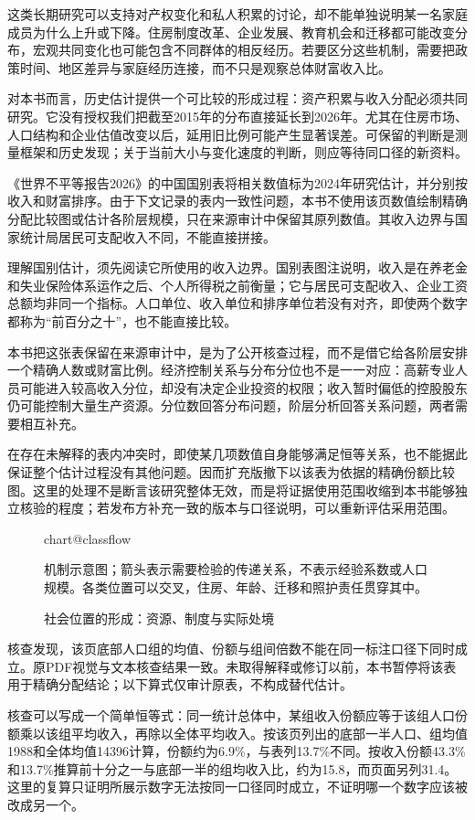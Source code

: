 \documentclass[UTF8,fontset=fandol,zihao=-4,oneside,openany]{ctexbook}
\makeatletter
\newcommand{\Chart}[3]{\begin{figure}[htbp]\centering\csname chart@#1\endcsname\caption{#2}\par\small #3\end{figure}}
\makeatother
\begin{document}
这类长期研究可以支持对产权变化和私人积累的讨论，却不能单独说明某一名家庭成员为什么上升或下降。住房制度改革、企业发展、教育机会和迁移都可能改变分布，宏观共同变化也可能包含不同群体的相反经历。若要区分这些机制，需要把政策时间、地区差异与家庭经历连接，而不只是观察总体财富收入比。

对本书而言，历史估计提供一个可比较的形成过程：资产积累与收入分配必须共同研究。它没有授权我们把截至2015年的分布直接延长到2026年。尤其在住房市场、人口结构和企业估值改变以后，延用旧比例可能产生显著误差。可保留的判断是测量框架和历史发现；关于当前大小与变化速度的判断，则应等待同口径的新资料。

《世界不平等报告2026》的中国国别表将相关数值标为2024年研究估计，并分别按收入和财富排序。由于下文记录的表内一致性问题，本书不使用该页数值绘制精确分配比较图或估计各阶层规模，只在来源审计中保留其原列数值。其收入边界与国家统计局居民可支配收入不同，不能直接拼接。\cite{WID2026}

\label{arg:P164}
理解国别估计，须先阅读它所使用的收入边界。国别表图注说明，收入是在养老金和失业保险体系运作之后、个人所得税之前衡量；它与居民可支配收入、企业工资总额均非同一个指标。人口单位、收入单位和排序单位若没有对齐，即使两个数字都称为“前百分之十”，也不能直接比较。

本书把这张表保留在来源审计中，是为了公开核查过程，而不是借它给各阶层安排一个精确人数或财富比例。经济控制关系与分布分位也不是一一对应：高薪专业人员可能进入较高收入分位，却没有决定企业投资的权限；收入暂时偏低的控股股东仍可能控制大量生产资源。分位数回答分布问题，阶层分析回答关系问题，两者需要相互补充。

在存在未解释的表内冲突时，即使某几项数值自身能够满足恒等关系，也不能据此保证整个估计过程没有其他问题。因而扩充版撤下以该表为依据的精确份额比较图。这里的处理不是断言该研究整体无效，而是将证据使用范围收缩到本书能够独立核验的程度；若发布方补充一致的版本与口径说明，可以重新评估采用范围。

\Chart{classflow}{社会位置的形成：资源、制度与实际处境}{机制示意图；箭头表示需要检验的传递关系，不表示经验系数或人口规模。各类位置可以交叉，住房、年龄、迁移和照护责任贯穿其中。}

核查发现，该页底部人口组的均值、份额与组间倍数不能在同一标注口径下同时成立。原PDF视觉与文本核查结果一致。未取得解释或修订以前，本书暂停将该表用于精确分配结论；以下算式仅审计原表，不构成替代估计。\cite{WID2026}

\label{arg:P165}
核查可以写成一个简单恒等式：同一统计总体中，某组收入份额应等于该组人口份额乘以该组平均收入，再除以全体平均收入。按该页列出的底部一半人口、组均值1988和全体均值14396计算，份额约为6.9\%，与表列13.7\%不同。按收入份额43.3\%和13.7\%推算前十分之一与底部一半的组均收入比，约为15.8，而页面另列31.4。这里的复算只证明所展示数字无法按同一口径同时成立，不证明哪一个数字应该被改成另一个。
\end{document}
